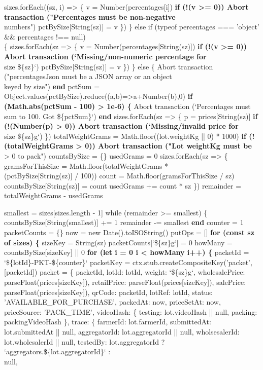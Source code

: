 \documentclass[12pt]{article}
\begin{document}
\begin{algorithm}[H]
\caption{packLotIntoPackets() (Part 2 of 4)}
sizes.forEach((sz, i) => \{\;
v = Number(percentages[i])\;
\textbf{if (!(v >= 0)) Abort transaction ("Percentages must be non-negative}\\
\quad numbers")\;
pctBySize[String(sz)] = v\;
\})\;
\} else if (typeof percentages === 'object' \&\& percentages !== null)\\
\quad \{\;
sizes.forEach(sz => \{\;
v = Number(percentages[String(sz)])\;
\textbf{if (!(v >= 0)) Abort transaction (`Missing/non-numeric percentage for}\\
\quad size \$\{sz\}`)\;
pctBySize[String(sz)] = v\;
\})\;
\} else \{\;
Abort transaction ("percentagesJson must be a JSON array or an object\\
\quad keyed by size")\;
\textbf{end}\;
pctSum = Object.values(pctBySize).reduce((a,b)=>a+Number(b),0)\;
\textbf{if (Math.abs(pctSum - 100) > 1e-6) \{}\;
Abort transaction (`Percentages must sum to 100. Got \$\{pctSum\}`)\;
\textbf{end}\;
sizes.forEach(sz => \{\;
p = prices[String(sz)]\;
\textbf{if (!(Number(p) > 0)) Abort transaction (`Missing/invalid price for}\\
\quad size \$\{sz\}g`)\;
\})\;
totalWeightGrams = Math.floor((lot.weightKg || 0) * 1000)\;
\textbf{if (!(totalWeightGrams > 0)) Abort transaction ("Lot weightKg must be}\\
\quad > 0 to pack")\;
countsBySize = \{\}\;
usedGrams = 0\;
sizes.forEach(sz => \{\;
gramsForThisSize = Math.floor(totalWeightGrams *\\
\quad (pctBySize[String(sz)] / 100))\;
count = Math.floor(gramsForThisSize / sz)\;
countsBySize[String(sz)] = count\;
usedGrams += count * sz\;
\})\;
remainder = totalWeightGrams - usedGrams\;
\end{algorithm}


\begin{algorithm}[H]
\caption{packLotIntoPackets() (Part 3 of 4)}
smallest = sizes[sizes.length - 1]\;
while (remainder >= smallest) \{\;
countsBySize[String(smallest)] += 1\;
remainder -= smallest\;
\textbf{end}\;
counter = 1\;
packetCounts = \{\}\;
now = new Date().toISOString()\;
putOps = []\;
\textbf{for (const sz of sizes) \{}\;
sizeKey = String(sz)\;
packetCounts[`\$\{sz\}g`] = 0\;
howMany = countsBySize[sizeKey] || 0\;
\textbf{for (let i = 0 i < howMany i++) \{}\;
packetId = `\$\{lotId\}-PKT-\$\{counter\}`\;
packetKey = ctx.stub.createCompositeKey('packet', [packetId])\;
packet = \{\;
packetId,\;
lotId: lotId,\;
weight: `\$\{sz\}g`,\;
wholesalePrice: parseFloat(prices[sizeKey]),\;
retailPrice: parseFloat(prices[sizeKey]),\;
salePrice: parseFloat(prices[sizeKey]),\;
qrCode: packetId,\;
lotRef: lotId,\;
status: 'AVAILABLE\_FOR\_PURCHASE',\;
packedAt: now,\;
priceSetAt: now,\;
priceSource: 'PACK\_TIME',\;
videoHash: \{\;
testing: lot.videoHash || null,\;
packing: packingVideoHash\;
\},\;
trace: \{\;
farmerId: lot.farmerId,\;
submittedAt: lot.submittedAt || null,\;
aggregatorId: lot.aggregatorId || null,\;
wholsesalerId: lot.wholesalerId || null,\;
testedBy: lot.aggregatorId ? `aggregators.\$\{lot.aggregatorId\}` :\\
\quad null,\;
\end{algorithm}
\end{document}
